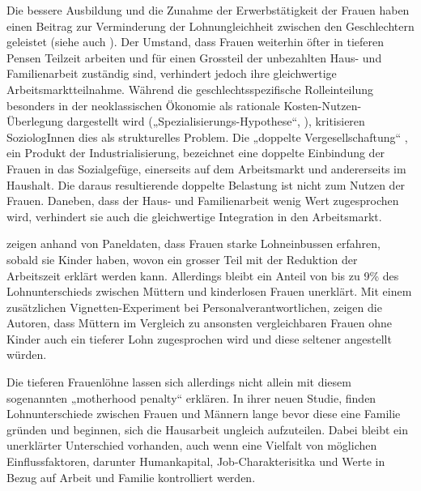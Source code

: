 \documentclass[a4paper,12pt]{article}
\begin{document}
Die bessere Ausbildung und die Zunahme der Erwerbstätigkeit der Frauen haben einen Beitrag
zur Verminderung der Lohnungleichheit zwischen den Geschlechtern geleistet
(siehe auch \citealp{Jann-Engelhardt-2008}). Der Umstand, dass Frauen weiterhin
öfter in tieferen Pensen Teilzeit arbeiten und für einen Grossteil der
unbezahlten Haus- und Familienarbeit zuständig sind, verhindert jedoch ihre
gleichwertige Arbeitsmarktteilnahme. Während die geschlechtsspezifische
Rolleinteilung besonders in der neoklassischen Ökonomie als rationale
Kosten-Nutzen-Überlegung dargestellt wird („Spezialisierungs-Hypothese“,
\citealp{Becker-1981}), kritisieren SoziologInnen dies als strukturelles
Problem. Die „doppelte Vergesellschaftung“ \citep{Becker-Schmidt-2008}, ein
Produkt der Industrialisierung, bezeichnet eine doppelte Einbindung der Frauen
in das Sozialgefüge, einerseits auf dem Arbeitsmarkt und andererseits im
Haushalt. Die daraus resultierende doppelte Belastung ist nicht zum Nutzen der
Frauen. Daneben, dass der Haus- und Familienarbeit wenig Wert zugesprochen
wird, verhindert sie auch die gleichwertige Integration in den Arbeitsmarkt.

\cite{Oesch:2017} zeigen anhand von Paneldaten, dass Frauen starke Lohneinbussen erfahren, sobald sie Kinder haben, wovon ein grosser Teil mit der Reduktion der Arbeitszeit erklärt werden kann. Allerdings bleibt ein Anteil von bis zu 9\% des Lohnunterschieds zwischen Müttern und kinderlosen Frauen unerklärt. Mit einem zusätzlichen Vignetten-Experiment bei Personalverantwortlichen, zeigen die Autoren, dass Müttern im Vergleich zu ansonsten vergleichbaren Frauen ohne Kinder auch ein tieferer Lohn zugesprochen wird und diese seltener angestellt würden. 

Die tieferen Frauenlöhne lassen sich allerdings nicht allein mit diesem sogenannten „motherhood penalty“  \citep{Budig-2001} erklären. In ihrer neuen Studie, finden \cite{Combet-2019} Lohnunterschiede zwischen Frauen und Männern lange bevor diese eine Familie gründen und beginnen, sich die Hausarbeit ungleich aufzuteilen. Dabei bleibt ein unerklärter Unterschied vorhanden, auch wenn eine Vielfalt von möglichen Einflussfaktoren, darunter Humankapital, Job-Charakterisitka und Werte in Bezug auf Arbeit und Familie kontrolliert werden. 
\end{document}

